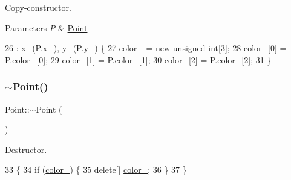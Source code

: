 Copy-\/constructor. 


\begin{DoxyParams}{Parameters}
{\em P} & \mbox{\hyperlink{class_point}{Point}} \\
\hline
\end{DoxyParams}

\begin{DoxyCode}
26                            : \mbox{\hyperlink{class_point_acfe156c55546f7e551fb54c7ea08a6cb}{x\_}}(P.\mbox{\hyperlink{class_point_acfe156c55546f7e551fb54c7ea08a6cb}{x\_}}), \mbox{\hyperlink{class_point_ae45effa2adb0036e4a770abb9b1160e6}{y\_}}(P.\mbox{\hyperlink{class_point_ae45effa2adb0036e4a770abb9b1160e6}{y\_}}) \{
27     \mbox{\hyperlink{class_point_af3333647d73989850d2fbf64d14eb9cb}{color\_}} = \textcolor{keyword}{new} \textcolor{keywordtype}{unsigned} \textcolor{keywordtype}{int}[3];
28     \mbox{\hyperlink{class_point_af3333647d73989850d2fbf64d14eb9cb}{color\_}}[0] = P.\mbox{\hyperlink{class_point_af3333647d73989850d2fbf64d14eb9cb}{color\_}}[0];
29     \mbox{\hyperlink{class_point_af3333647d73989850d2fbf64d14eb9cb}{color\_}}[1] = P.\mbox{\hyperlink{class_point_af3333647d73989850d2fbf64d14eb9cb}{color\_}}[1];
30     \mbox{\hyperlink{class_point_af3333647d73989850d2fbf64d14eb9cb}{color\_}}[2] = P.\mbox{\hyperlink{class_point_af3333647d73989850d2fbf64d14eb9cb}{color\_}}[2];
31 \}
\end{DoxyCode}
\mbox{\label{class_point_a395fa04b4ec126b66fc053f829a30cc1}} 
\subsubsection{\texorpdfstring{$\sim$\+Point()}{~Point()}}
{\footnotesize\ttfamily Point\+::$\sim$\+Point (\begin{DoxyParamCaption}{ }\end{DoxyParamCaption})}



Destructor. 


\begin{DoxyCode}
33               \{
34     \textcolor{keywordflow}{if} (\mbox{\hyperlink{class_point_af3333647d73989850d2fbf64d14eb9cb}{color\_}}) \{
35         \textcolor{keyword}{delete}[] \mbox{\hyperlink{class_point_af3333647d73989850d2fbf64d14eb9cb}{color\_}};
36     \}
37 \}
\end{DoxyCode}


